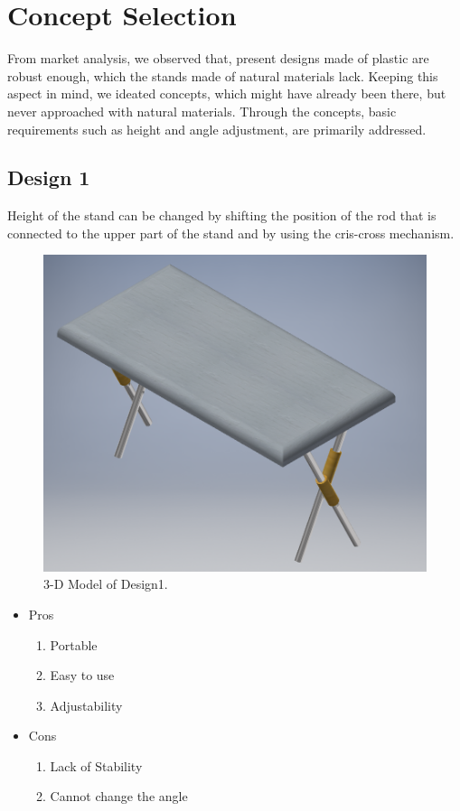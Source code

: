 \chapter{Concept Selection}

From market analysis, we observed that, present designs made of plastic are robust enough, which the stands made of natural materials lack. Keeping this aspect in mind, we ideated concepts, which might have already been there, but never approached with natural materials. Through the concepts, basic requirements such as height and angle adjustment, are primarily addressed.

\section{Design 1}

Height of the stand can be changed by shifting the position of the rod that is connected to the upper part of the stand and by using the cris-cross mechanism. 

\begin{figure}
  \includegraphics[width=\linewidth]{design1}
  \caption{3-D Model of Design1.}
  \label{fig:Design1}
\end{figure}


\begin{itemize}
 \item Pros
 \begin{enumerate}
	\item Portable
    \item Easy to use
    \item Adjustability
 \end{enumerate}
 \item Cons
 \begin{enumerate}
	\item Lack of Stability
    \item Cannot change the angle
 \end{enumerate}
\end{itemize}



